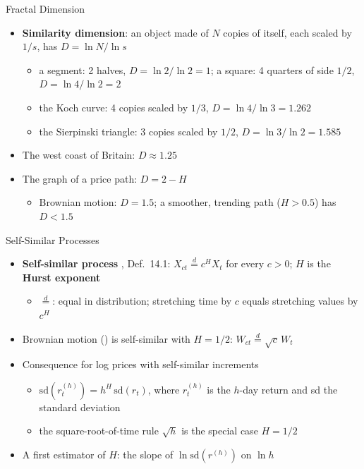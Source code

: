 \begin{frame}{Fractal Dimension}
\itemsize{\small}
\begin{itemize}
    \item \textbf{Similarity dimension}: an object made of $N$ copies of itself, each scaled by $1/s$, has $D = \ln N/\ln s$
    \begin{itemize}
        \item a segment: 2 halves, $D = \ln 2/\ln 2 = 1$; a square: 4 quarters of side $1/2$, $D = \ln 4/\ln 2 = 2$
        \item the Koch curve: 4 copies scaled by $1/3$, $D = \ln 4/\ln 3 = 1.262$
        \item the Sierpinski triangle: 3 copies scaled by $1/2$, $D = \ln 3/\ln 2 = 1.585$
    \end{itemize}
    \item The west coast of Britain: $D \approx 1.25$ 
    \item The graph of a price path: $D = 2 - H$
    \begin{itemize}
        \item Brownian motion: $D = 1.5$; a smoother, trending path ($H > 0.5$) has $D < 1.5$
    \end{itemize}
\end{itemize}
\end{frame}

\begin{frame}{Self-Similar Processes}
\itemsize{\small}
\begin{itemize}
    \item \textbf{Self-similar process} , Def.~14.1: $X_{ct} \overset{d}{=} c^H X_t$ for every $c > 0$; $H$ is the \textbf{Hurst exponent}
    \begin{itemize}
        \item $\overset{d}{=}$: equal in distribution; stretching time by $c$ equals stretching values by $c^H$
    \end{itemize}
    \item Brownian motion () is self-similar with $H = 1/2$: $W_{ct} \overset{d}{=} \sqrt{c}\,W_t$
    \item Consequence for log prices with self-similar increments
    \begin{itemize}
        \item $\mathrm{sd}(r_t^{(h)}) = h^H\,\mathrm{sd}(r_t)$, where $r_t^{(h)}$ is the $h$-day return and sd the standard deviation
        \item the square-root-of-time rule $\sqrt{h}$ is the special case $H = 1/2$
    \end{itemize}
    \item A first estimator of $H$: the slope of $\ln \mathrm{sd}(r^{(h)})$ on $\ln h$
\end{itemize}
\end{frame}

